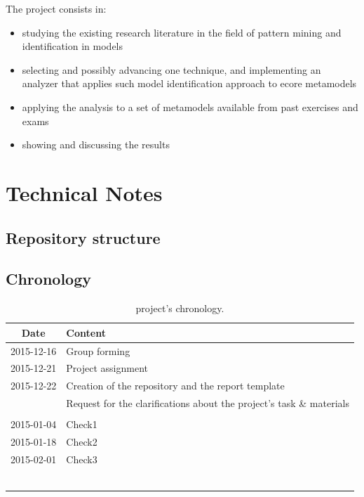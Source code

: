 \documentclass[a4paper,12pt,titlepage,fullpage]{article} %
\begin{document}
\vspace{15pt}

The project consists in:

\begin{itemize}
	\item studying the existing research literature in the field of pattern mining and identification in models
	\item selecting and possibly advancing one technique, and implementing an analyzer that applies such model identification approach to ecore metamodels
	\item applying the analysis to a set of metamodels available from past exercises and exams
	\item showing and discussing the results
\end{itemize}


\newpage
\section{Technical Notes}
\subsection{Repository structure}

\subsection{Chronology}
\begin{longtable}{|c|p{13cm}|}
	\hline
	Date & Content \\
	\hline
	2015-12-16 & Group forming \\
	\hline
	2015-12-21 & Project assignment \\
	\hline
	2015-12-22 & Creation of the repository and the report template \\
	& Request for the clarifications about the project's task \& materials \\
	\hline
	& \\
	\hline
	2015-01-04 & Check1 \\
	\hline
	2015-01-18 & Check2 \\
	\hline
	2015-02-01 & Check3 \\
	\hline
	& \\
	\hline
	& \\
	\hline
	& \\
	\hline
	& \\
	\hline
	& \\
	\hline
	\caption{project's chronology.}
\end{longtable}
\end{document}
